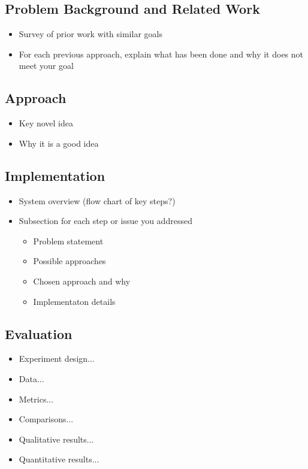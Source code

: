 \documentclass[pageno]{jpaper}
\begin{document}
\subsection{Problem Background and Related Work}
\begin{itemize}
	\item Survey of prior work with similar goals 
	\item For each previous approach, explain what has been done and why it does not meet your goal
\end{itemize}

\subsection{Approach}
\begin{itemize}
	\item Key novel idea
	\item Why it is a good idea
\end{itemize}

\subsection{Implementation}
\begin{itemize}
	\item System overview (flow chart of key steps?)
	\item Subsection for each step or issue you addressed
	\begin{itemize}
		\item Problem statement
		\item Possible approaches
		\item Chosen approach and why
		\item Implementaton details
	\end{itemize}
\end{itemize}

\subsection{Evaluation}
\begin{itemize}
	\item Experiment design...
	\item Data...
	\item Metrics...
	\item Comparisons...
	\item Qualitative results...
	\item Quantitative results...
\end{itemize}
\end{document}
